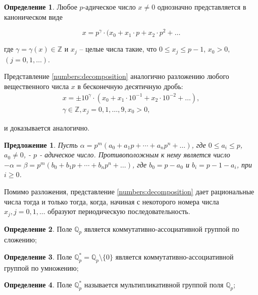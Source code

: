 \documentclass[master, och, diploma, times]{sty/SCWorks}
\theoremstyle{plain}
\newtheorem{proposition}{Предложение}[section]
\theoremstyle{definition}
\newtheorem{defn}{Определение}[section]
\begin{document}
\begin{defn}
Любое $p$-адическое число $x \ne 0$ однозначно представляется в каноническом виде

\begin{equation} \label{numbers:decomposition}
	x = p^{\gamma} \cdot (x_0 + x_1\cdot p + x_2 \cdot p^2 + \dots
\end{equation}

\noindent где $\gamma = \gamma(x) \in \mathbb {Z}$ и $x_j$ -- целые числа такие, что $0 \le x_j \le p-1$, $x_0 > 0,$ \linebreak $(j=0,1,\dots)$. 
\end{defn}

Представление \eqref{numbers:decomposition} аналогично разложению любого вещественного числа $x$ в бесконечную десятичную дробь:
\begin{equation*}
\begin{aligned}
	x=\pm10^\gamma \cdot (x_0 + x_1 \cdot 10^{-1} + x_2 \cdot 10^{-2} + \dots),\\
	\gamma \in \mathbb {Z}, x_j = 0, 1, \dots, 9, x_0 > 0,
\end{aligned}
\end{equation*}

\noindent и доказывается аналогично.

\begin{proposition}
Пусть $\alpha=p^m(a_0+a_1p+\cdots +a_np^n+\dots)$, где $0 \le a_i \le p$, $a_0 \neq 0$, - $p$ - адическое число. Противоположным к нему является число $- \alpha=\beta=p^m(b_0+b_1p+\cdots+b_np^n+\dots)$, где $b_0=p-a_0$ и $b_i=p-1-a_i$, при $i \geq 0$.
\end{proposition}\label{adic:pros:minus}

Помимо разложения, представление \eqref{numbers:decomposition} дает рациональные числа тогда и только тогда, когда, начиная с некоторого номера числа $x_j, j=0,1,\dots$ образуют периодическую последовательность.

\begin{defn}
Поле $\mathbb {Q}_p$ является коммутативно-ассоциативной группой по сложению;
\end{defn}

\begin{defn}
Поле $\mathbb {Q}_p^*=\mathbb {Q}_p \setminus \{0\}$ является коммутативно-ассоциативной группой по умножению;
\end{defn}

\begin{defn}
Поле $\mathbb {Q}_p^*$ называется мультипликативной группой поля $\mathbb {Q}_p$\cite{bib:analysis:baker};
\end{defn}
\end{document}

